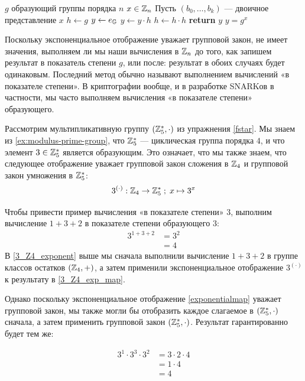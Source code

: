 \begin{algorithm}\caption{Возведение в степень в циклической группе}
\label{alg_square-and-mul}
\begin{algorithmic}[0]
\Require $g$ образующий группы порядка $n$
\Require $x \in \mathbb{Z}_n$ 
\State Пусть $(b_0,\ldots,b_k)$ — двоичное представление $x$ 
\State $h \gets g$
\State $y \gets e_{\mathbb{G}}$
		\State $y\gets y\cdot h$ 
	\EndIf
	\State $h \gets h\cdot h$ 
\EndFor
\State \textbf{return} $y$
\EndProcedure
\Ensure $ y = g^x$
\end{algorithmic}
\end{algorithm}

Поскольку экспоненциальное отображение уважает групповой закон, не имеет значения, выполняем ли мы наши вычисления в $\mathbb{Z}_n$ до того, как запишем результат в показатель степени $g$, или после: результат в обоих случаях будет одинаковым. Последний метод обычно называют выполнением вычислений «в показателе степени». В криптографии вообще, и в разработке SNARKов в частности, мы часто выполняем вычисления «в показателе степени» образующего.
\begin{example}\label{ex:in-the-exponent} Рассмотрим мультипликативную группу $(\mathbb{Z}_{5}^*,\cdot)$ из упражнения \ref{fstar}. Мы знаем из \exercisename{} \ref{ex:modulus-prime-group}, что $\mathbb{Z}_{5}^*$ — циклическая группа порядка $4$, и что элемент $3\in\mathbb{Z}_5^*$ является образующим. Это означает, что мы также знаем, что следующее отображение уважает групповой закон сложения в $\mathbb{Z}_4$ и групповой закон умножения в $\mathbb{Z}_5^*$:
$$
3^{(\cdot)}: \mathbb{Z}_4 \to \mathbb{Z}_5^* \;;\; x \mapsto 3^x
$$

Чтобы привести пример вычисления «в показателе степени» $3$, выполним вычисление $1+3+2$ в показателе степени образующего $3$:
\begin{align}
3^{1+3+2} &=3^{2}\label{3_Z4_exponent}\\
          & = 4\label{3_Z4_exp_map}
\end{align}
В \eqref{3_Z4_exponent} выше мы сначала выполнили вычисление $1+3+2$ в группе классов остатков $(\mathbb{Z}_4,+)$, а затем применили экспоненциальное отображение $3^{(\cdot)}$ к результату в \eqref{3_Z4_exp_map}. 

Однако поскольку экспоненциальное отображение \eqref{exponentialmap} уважает групповой закон, мы также могли бы отобразить каждое слагаемое в $(\mathbb{Z}_5^*,\cdot)$ сначала, а затем применить групповой закон $(\mathbb{Z}_5^*,\cdot)$. Результат гарантированно будет тем же:

\begin{align*}
3^1 \cdot 3^3 \cdot 3^{2}
          & = 3\cdot 2 \cdot 4\\
          & = 1\cdot 4\\
          & = 4
\end{align*}
\end{example}
